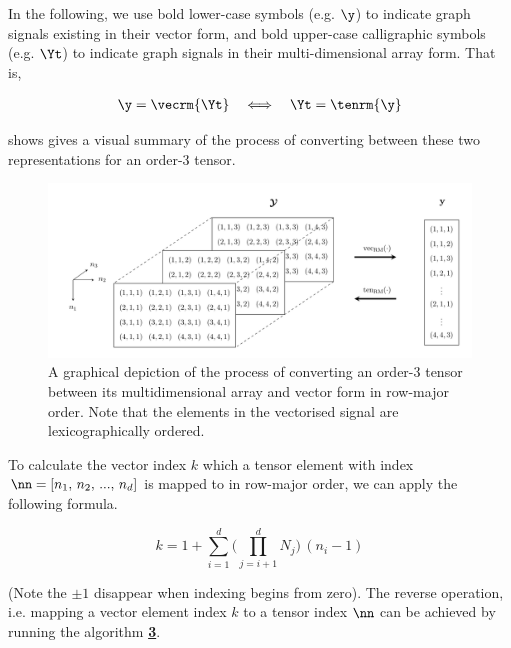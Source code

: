 In the following, we use bold lower-case symbols (e.g. $\y$) to indicate graph signals existing in their vector form, and bold upper-case calligraphic symbols (e.g. $\Yt$) to indicate graph signals in their multi-dimensional array form. That is, 

\begin{align*}
    \y = \vecrm{\Yt} \quad \Longleftrightarrow \quad \Yt  = \tenrm{\y}
\end{align*}

 shows gives a visual summary of the process of converting between these two representations for an order-3 tensor. 


\begin{figure}[t]
    \begin{center}
        \includegraphics[width=\linewidth]{Figures/tensor_vec.pdf}    
    \end{center}
    \caption[Conversion between a multidimensional array and a vector]{A graphical depiction of the process of converting an order-3 tensor between its multidimensional array and vector form in row-major order. Note that the elements in the vectorised signal are lexicographically ordered. }
    \label{fig:ten_to_vec}
\end{figure}


To calculate the vector index $k$ which a tensor element with index $\nn = [n_1,\, n_2,\, ...,\, n_d]$ is mapped to in row-major order, we can apply the following formula.  

\begin{equation}
    \label{eq:vec}
    k = 1 + \sum_{i=1}^d \Big( \prod_{j=i+1}^d N_j \Big) \, (n_i - 1)
\end{equation}

(Note the $\pm1$ disappear when indexing begins from zero). The reverse operation, i.e. mapping a vector element index $k$ to a tensor index $\nn$ can be achieved by running the algorithm \hyperlink{vectoten}{\textbf{3}}. 


